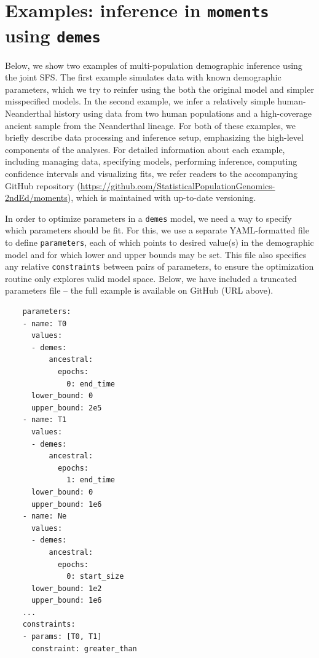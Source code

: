 \documentclass[]{article}
\newcommand{\moments}{\texttt{moments}\xspace}
\newcommand{\demes}{\texttt{demes}\xspace}
\begin{document}
\section*{Examples: inference in \moments using \demes}

Below, we show two examples of multi-population demographic inference using the
joint SFS. The first example simulates data with known demographic parameters,
which we try to reinfer using the both the original model and simpler
misspecified models. In the second example, we infer a relatively simple
human-Neanderthal history using data from two human populations and a
high-coverage ancient sample from the Neanderthal lineage. For both of these
examples, we briefly describe data processing and inference setup, emphasizing
the high-level components of the analyses. For detailed information about each
example, including managing data, specifying models, performing inference,
computing confidence intervals and visualizing fits, we refer readers to the
accompanying GitHub repository
(\url{https://github.com/StatisticalPopulationGenomics-2ndEd/moments}), which
is maintained with up-to-date versioning.

In order to optimize parameters in a \demes model, we need a way to specify
which parameters should be fit. For this, we use a separate YAML-formatted file
to define \texttt{parameters}, each of which points to desired value(s) in the
demographic model and for which lower and upper bounds may be set. This file
also specifies any relative \texttt{constraints} between pairs of parameters,
to ensure the optimization routine only explores valid model space. Below, we
have included a truncated parameters file -- the full example is available on
GitHub (URL above).
\begin{verbatim}
    parameters:
    - name: T0
      values:
      - demes:
          ancestral:
            epochs:
              0: end_time
      lower_bound: 0
      upper_bound: 2e5
    - name: T1
      values:
      - demes:
          ancestral:
            epochs:
              1: end_time
      lower_bound: 0
      upper_bound: 1e6
    - name: Ne
      values:
      - demes:
          ancestral:
            epochs:
              0: start_size
      lower_bound: 1e2
      upper_bound: 1e6
    ...
    constraints:
    - params: [T0, T1]
      constraint: greater_than
\end{verbatim}
\end{document}
